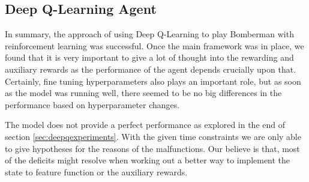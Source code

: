
\subsection{Deep Q-Learning Agent}

In summary, the approach of using Deep Q-Learning to play Bomberman with reinforcement learning was successful. Once the main framework was in place, we found that it is very important to give a lot of thought into the rewarding and auxiliary rewards as the performance of the agent depends crucially upon that. Certainly, fine tuning hyperparameters also plays an important role, but as soon as the model was running well, there seemed to be no big differences in the performance based on hyperparameter changes.

The model does not provide a perfect performance as explored in the end of section \ref{sec:deepqexperiments}. With the given time constraints we are only able to give hypotheses for the reasons of the malfunctions. Our believe is that, most of the deficits might resolve when working out a better way to implement the state to feature function or the auxiliary rewards.
